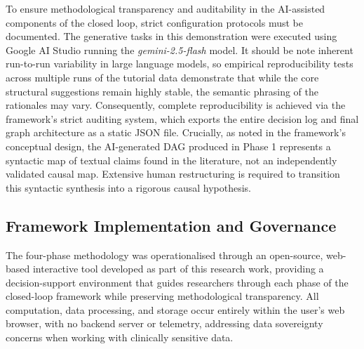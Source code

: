 \documentclass[sn-vancouver-num]{sn-jnl}
\begin{document}
To ensure methodological transparency and auditability in the AI-assisted components of the closed loop, strict configuration protocols must be documented. The generative tasks in this demonstration were executed using Google AI Studio running the \textit{gemini-2.5-flash} model. It should be note inherent run-to-run variability in large language models, so empirical reproducibility tests across multiple runs of the tutorial data demonstrate that while the core structural suggestions remain highly stable, the semantic phrasing of the rationales may vary. Consequently, complete reproducibility is achieved via the framework's strict auditing system, which exports the entire decision log and final graph architecture as a static JSON file. Crucially, as noted in the framework's conceptual design, the AI-generated DAG produced in Phase 1 represents a syntactic map of textual claims found in the literature, not an independently validated causal map. Extensive human restructuring is required to transition this syntactic synthesis into a rigorous causal hypothesis.

\subsection{Framework Implementation and Governance}
The four-phase methodology was operationalised through an open-source, web-based interactive tool developed as part of this research work, providing a decision-support environment that guides researchers through each phase of the closed-loop framework while preserving methodological transparency. All computation, data processing, and storage occur entirely within the user's web browser, with no backend server or telemetry, addressing data sovereignty concerns when working with clinically sensitive data. 
\end{document}
